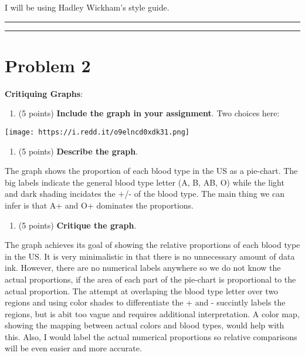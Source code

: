 \documentclass[]{article}
\providecommand{\tightlist}{%
  \setlength{\itemsep}{0pt}\setlength{\parskip}{0pt}}
\begin{document}
I will be using Hadley Wickham's style guide.

\begin{center}\rule{0.5\linewidth}{\linethickness}\end{center}

\begin{center}\rule{0.5\linewidth}{\linethickness}\end{center}

\hypertarget{problem-2}{%
\section{Problem 2}\label{problem-2}}

\textbf{Critiquing Graphs}:

\begin{enumerate}
\def\labelenumi{\alph{enumi}.}
\tightlist
\item
  (5 points) \textbf{Include the graph in your assignment}. Two choices
  here:
\end{enumerate}

\texttt{[image: https://i.redd.it/o9elncd0xdk31.png]}

\begin{enumerate}
\def\labelenumi{\alph{enumi}.}
\setcounter{enumi}{1}
\tightlist
\item
  (5 points) \textbf{Describe the graph}.
\end{enumerate}

The graph shows the proportion of each blood type in the US as a
pie-chart. The big labels indicate the general blood type letter (A, B,
AB, O) while the light and dark shading incidates the +/- of the blood
type. The main thing we can infer is that A+ and O+ dominates the
proportions.

\begin{enumerate}
\def\labelenumi{\alph{enumi}.}
\setcounter{enumi}{2}
\tightlist
\item
  (5 points) \textbf{Critique the graph}.
\end{enumerate}

The graph achieves its goal of showing the relative proportions of each
blood type in the US. It is very minimalistic in that there is no
unnecessary amount of data ink. However, there are no numerical labels
anywhere so we do not know the actual proportions, if the area of each
part of the pie-chart is proportional to the actual proportion. The
attempt at overlaping the blood type letter over two regions and using
color shades to differentiate the + and - succintly labels the regions,
but is abit too vague and requires additional interpretation. A color
map, showing the mapping between actual colors and blood types, would
help with this. Also, I would label the actual numerical proportions so
relative comparisons will be even easier and more accurate.
\end{document}
